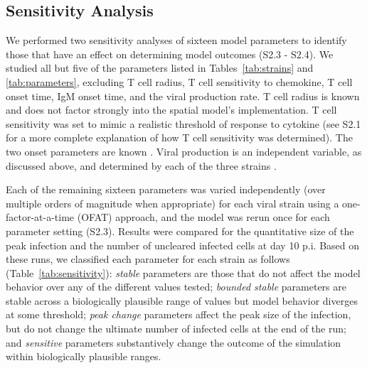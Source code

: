 \documentclass[preprint,10pt,authoryear]{elsarticle}
\begin{document}


\subsection*{Sensitivity Analysis}


We performed two sensitivity analyses of sixteen model parameters to identify those that have an effect on determining model outcomes (S2.3 - S2.4). We studied all but five of the parameters listed in Tables~\ref{tab:strains} and \ref{tab:parameters}, excluding T cell radius, T cell sensitivity to chemokine, T cell onset time, IgM onset time, and the viral production rate.  T cell radius is known \citep{abbas2011cellular} and does not factor strongly into the spatial model's implementation.  T cell sensitivity was set to mimic a realistic threshold of response to cytokine (see S2.1 for a more complete explanation of how T cell sensitivity was determined).  The two onset parameters are known \citep{Diamond2003}.  Viral production is an independent variable, as discussed above, and determined by each of the three strains \citep{Mitchell2011}.

Each of the remaining sixteen parameters was varied independently (over multiple orders of magnitude when appropriate) for each viral strain using a one-factor-at-a-time (OFAT) approach, and the model was rerun once for each parameter setting (S2.3).  Results were compared for the quantitative size of the peak infection and the number of uncleared infected cells at day 10 p.i.  Based on these runs, we classified each parameter for each strain as follows (Table~\ref{tab:sensitivity}): \textit{stable} parameters are those that do not affect the model behavior over any of the different values tested; \textit{bounded stable} parameters are stable across a biologically plausible range of values but model behavior diverges at some threshold; \textit{peak change} parameters affect the peak size of the infection, but do not change the ultimate number of infected cells at the end of the run; and \textit{sensitive} parameters substantively change the outcome of the simulation within biologically plausible ranges.  
\end{document}

